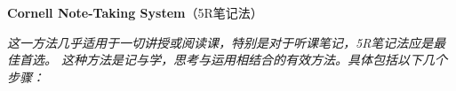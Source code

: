 \begin{shaded}
	{\bf\Large Cornell Note-Taking System}\hfill{（5R笔记法）}
	
	\bigskip
	
	{\it 这一方法几乎适用于一切讲授或阅读课，特别是对于听课笔记，5R笔记法应是最佳首选。
	这种方法是记与学，思考与运用相结合的有效方法。具体包括以下几个步骤：}
	
	\begin{center}
		\quad

\end{center}
\end{shaded}
